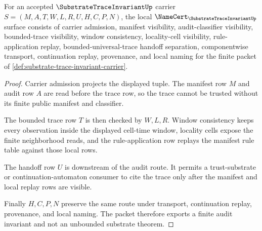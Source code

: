 \begin{theorem}
\label{thm:substrate-trace-invariant-namecert-obligations}
For an accepted $\SubstrateTraceInvariantUp$ carrier $S=(M,A,T,W,L,R,U,H,C,P,N)$, the local $\NameCert_{\SubstrateTraceInvariantUp}$ surface consists of carrier admission, manifest visibility, audit-classifier visibility, bounded-trace visibility, window consistency, locality-cell visibility, rule-application replay, bounded-universal-trace handoff separation, componentwise transport, continuation replay, provenance, and local naming for the finite packet of \autoref{def:substrate-trace-invariant-carrier}.
\end{theorem}
\begin{proof}
Carrier admission projects the displayed tuple. The manifest row $M$ and audit row $A$ are read before the trace row, so the trace cannot be trusted without its finite public manifest and classifier.

The bounded trace row $T$ is then checked by $W,L,R$. Window consistency keeps every observation inside the displayed cell-time window, locality cells expose the finite neighborhood reads, and the rule-application row replays the manifest rule table against those local rows.

The handoff row $U$ is downstream of the audit route. It permits a trust-substrate or continuation-automaton consumer to cite the trace only after the manifest and local replay rows are visible.

Finally $H,C,P,N$ preserve the same route under transport, continuation replay, provenance, and local naming. The packet therefore exports a finite audit invariant and not an unbounded substrate theorem.
\end{proof}

